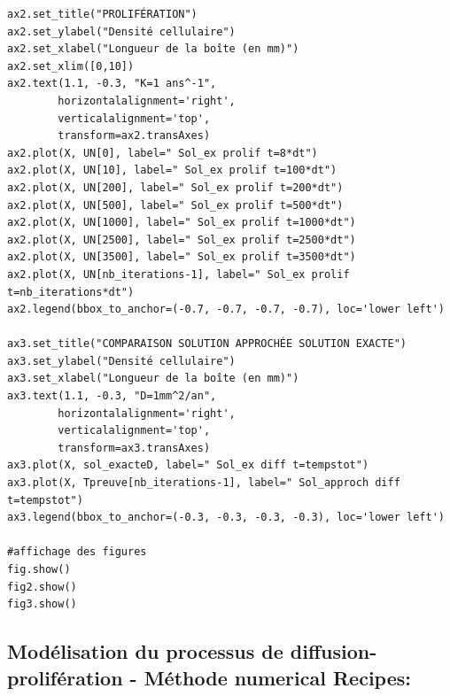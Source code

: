 \documentclass[12pt,a4paper]{article}
\begin{document}
\begin{lstlisting}[style=stylepython]
ax2.set_title("PROLIFÉRATION")
ax2.set_ylabel("Densité cellulaire")
ax2.set_xlabel("Longueur de la boîte (en mm)")
ax2.set_xlim([0,10])
ax2.text(1.1, -0.3, "K=1 ans^-1",
        horizontalalignment='right',
        verticalalignment='top',
        transform=ax2.transAxes)
ax2.plot(X, UN[0], label=" Sol_ex prolif t=8*dt")
ax2.plot(X, UN[10], label=" Sol_ex prolif t=100*dt")
ax2.plot(X, UN[200], label=" Sol_ex prolif t=200*dt")
ax2.plot(X, UN[500], label=" Sol_ex prolif t=500*dt")
ax2.plot(X, UN[1000], label=" Sol_ex prolif t=1000*dt")
ax2.plot(X, UN[2500], label=" Sol_ex prolif t=2500*dt")
ax2.plot(X, UN[3500], label=" Sol_ex prolif t=3500*dt")
ax2.plot(X, UN[nb_iterations-1], label=" Sol_ex prolif t=nb_iterations*dt")
ax2.legend(bbox_to_anchor=(-0.7, -0.7, -0.7, -0.7), loc='lower left')

ax3.set_title("COMPARAISON SOLUTION APPROCHÉE SOLUTION EXACTE")
ax3.set_ylabel("Densité cellulaire")
ax3.set_xlabel("Longueur de la boîte (en mm)")
ax3.text(1.1, -0.3, "D=1mm^2/an",
        horizontalalignment='right',
        verticalalignment='top',
        transform=ax3.transAxes)
ax3.plot(X, sol_exacteD, label=" Sol_ex diff t=tempstot")
ax3.plot(X, Tpreuve[nb_iterations-1], label=" Sol_approch diff t=tempstot")
ax3.legend(bbox_to_anchor=(-0.3, -0.3, -0.3, -0.3), loc='lower left')

#affichage des figures
fig.show()
fig2.show()
fig3.show()
\end{lstlisting}
\newpage
\subsection{Modélisation du processus de diffusion-prolifération - Méthode numerical Recipes: }
\\
\end{document}
